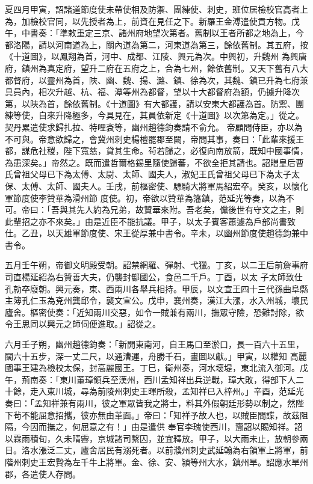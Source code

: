 \begin{pinyinscope}
 夏四月甲寅，詔諸道節度使未帶使相及防禦、團練使、刺史，班位居檢校官高者上為，加檢校官同，以先授者為上，前資在見任之下。新羅王金溥遣使貢方物。戊午，中書奏：「準敕重定三京、諸州府地望次第者。舊制以王者所都之地為上，今都洛陽，請以河南道為上，關內道為第二，河東道為第三，餘依舊制。其五府，按《十道圖》，以鳳翔為首，河中、成都、江陵、興元為次。中興初，升魏州
 為興唐府，鎮州為真定府，望升二府在五府之上，合為七州，餘依舊制。又天下舊有八大都督府，以靈州為首，陜、幽、魏、揚、潞、鎮、徐為次，其魏、鎮已升為七府兼具員內，相次升越、杭、福、潭等州為都督，望以十大都督府為額，仍據升降次第，以陜為首，餘依舊制。《十道圖》有大都護，請以安東大都護為首。防禦、團練等使，自來升降極多，今具見在，其員依新定《十道圖》以次第為定。」從之。契丹累遣使求歸扎拉、特哩袞等，幽州趙德鈞奏請不俞允。
 帝顧問侍臣，亦以為不可與。帝意欲歸之，會冀州刺史楊檀罷郡至闕，帝問其事，奏曰：「此輩來援王都，謀危社稷，陛下寬慈，貸其生命。茍若歸之，必復向南放箭，既知中國事情，為患深矣。」帝然之。既而遣哲爾格錫里隨使歸蕃，不欲全拒其請也。詔贈皇后曹氏曾祖父母已下為太傅、太尉、太師、國夫人，淑妃王氏曾祖父母已下為太子太保、太傅、太師、國夫人。壬戌，前樞密使、驃騎大將軍馬紹宏卒。癸亥，以懷化軍節度使李贊華為滑州節
 度使。初，帝欲以贊華為籓鎮，范延光等奏，以為不可。帝曰：「吾與其先人約為兄弟，故贊華來附。吾老矣，儻後世有守文之主，則此輩招之亦不來矣。」由是近臣不能抗議。甲子，以太子賓客蕭遽為戶部尚書致仕。乙丑，以天雄軍節度使、宋王從厚兼中書令。辛未，以幽州節度使趙德鈞兼中書令。



 五月壬午朔，帝御文明殿受朝。詔禁網羅、彈射、弋獵。丁亥，以二王后前詹事府司直楊延紹為右贊善大夫，仍襲封酅國公，食邑二千戶。丁酉，以太
 子太師致仕孔勍卒廢朝。興元奏，東、西兩川各舉兵相持。甲辰，以文宣王四十三代孫曲阜縣主簿孔仁玉為兗州龔邱令，襲文宣公。戊申，襄州奏，漢江大漲，水入州城，壞民廬舍。樞密使奏：「近知兩川交惡，如令一賊兼有兩川，撫眾守險，恐難討除，欲令王思同以興元之師伺便進取。」詔從之。



 六月壬子朔，幽州趙德鈞奏：「新開東南河，自王馬口至淤口，長一百六十五里，闊六十五步，深一丈二尺，以通漕運，舟勝千石，畫圖以獻。」甲寅，以權知
 高麗國事王建為檢校太保，封高麗國王。丁巳，衛州奏，河水壞堤，東北流入御河。戊午，荊南奏：「東川董璋領兵至漢州，西川孟知祥出兵逆戰，璋大敗，得部下人二十餘，走入東川城，尋為前陵州刺史王暉所殺，孟知祥已入梓州。」辛酉，范延光奏曰：「孟知祥兼有兩川，彼之軍眾皆我之將士，料其外假朝廷形勢以制之，然陛下茍不能屈意招攜，彼亦無由革面。」帝曰：「知祥予故人也，以賊臣間諜，故茲阻隔，今因而撫之，何屈意之有！」由是遣供
 奉官李瑰使西川，齎詔以賜知祥。詔以霖雨積旬，久未晴霽，京城諸司繫囚，並宜釋放。甲子，以大雨未止，放朝參兩日。洛水漲泛二丈，廬舍居民有溺死者。以前濮州刺史武延翰為右領軍上將軍，前階州刺史王宏贄為左千牛上將軍。金、徐、安、潁等州大水，鎮州旱。詔應水旱州郡，各遣使人存問。




\end{pinyinscope}
